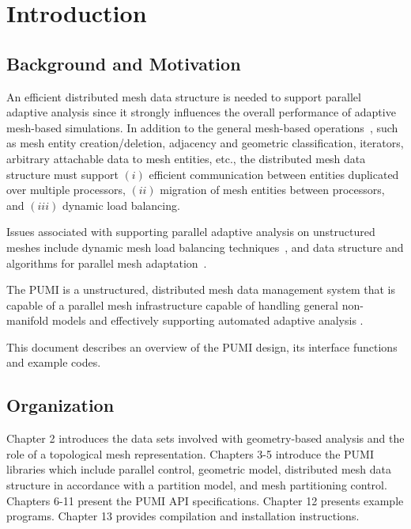 \section{Introduction}

\subsection{Background and Motivation}
An efficient distributed mesh data structure is needed to support
parallel adaptive analysis since it strongly influences
the overall performance of adaptive mesh-based simulations. In addition to
the general mesh-based operations~\cite{beall97}, such as mesh entity creation/deletion,
adjacency and geometric classification, iterators, arbitrary 
attachable data to mesh entities, etc., the distributed
mesh data structure must support $(i)$ efficient communication between
 entities duplicated over multiple processors, $(ii)$ migration of mesh entities
 between processors, and $(iii)$ dynamic load balancing. 

Issues associated with supporting parallel adaptive
analysis on unstructured meshes include dynamic mesh
load balancing techniques~\cite{deCougny-etal95, Diekmann-etal00, Teresco-etal00, Walshaw-Cross00}, and data structure and algorithms for parallel 
mesh adaptation~\cite{Ozturan-etal94, deCougny-Shephard99, libmesh, Oliker-etal00, Park-Kwon05, Remacle-etal02, Selwood-Berzins99, seolthesis, fmdb06}. 

The PUMI is a unstructured, distributed mesh data management system that is capable of a parallel mesh infrastructure capable of handling general non-manifold \cite{Mantyla88, weiler88} models and
effectively supporting automated adaptive analysis \cite{pumi16}. 

This document describes an overview of the PUMI design, its interface functions and example codes.

\subsection{Organization}

Chapter 2 introduces the data sets involved with geometry-based analysis and the role of a topological mesh representation. Chapters 3-5 introduce the PUMI libraries which include parallel control, geometric model, distributed mesh data structure in accordance with a partition model, and mesh partitioning control. Chapters 6-11 present the PUMI API specifications. Chapter 12 presents example programs. Chapter 13 provides compilation and installation instructions.

